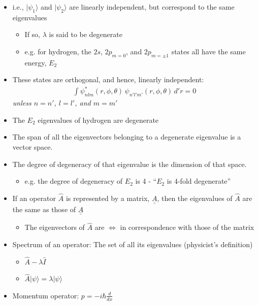 \documentclass[a4paper,11pt,normalem]{article}
\begin{document}
\begin{itemize}
\item
  i.e., \(|\psi_1\rangle\) and \(|\psi_2\rangle\) are linearly
  independent, but correspond to the same eigenvalues
  \begin{itemize}
  \item
    If so, \(\lambda\) is said to be degenerate
  \item
    e.g. for hydrogen, the \(2s\), \(2p_{m=0}\), and \(2p_{m=\pm1}\)
    states all have the same energy, \(E_2\)
  \end{itemize}
\item
  These states are orthogonal, and hence, linearly independent:
\[
    \begin{aligned}
    \int \psi_{nlm}^* (r,\phi,\theta)\,\psi_{n'l'm'}(r,\phi,\theta)\,d'r = 0
    \end{aligned}
\]
\emph{unless \(n = n'\), \(l = l'\), and \(m = m'\)}
\item
  The \(E_2\) eigenvalues of hydrogen are degenerate
\item
  The span of all the eigenvectors belonging to a degenerate eigenvalue
  is a vector space.
\item
  The degree of degeneracy of that eigenvalue is the dimension of that
  space.
  \begin{itemize}
  \item
    e.g. the degree of degeneracy of \(E_2\) is 4 - ``\(E_2\) is 4-fold
    degenerate''
  \end{itemize}
\item
  If an operator \(\hat{A}\) is represented by a matrix,
  \(\underline{\underline{A}}\), then the eigenvalues of \(\hat{A}\) are
  the same as those of \(\underline{\underline{A}}\)
  \begin{itemize}
  \item
    The eigenvectors of \(\hat{A}\) are \(\iff\) in correspondence with
    those of the matrix
  \end{itemize}
\item
  Spectrum of an operator: The set of all its eigenvalues (physicist's
  definition)
  \begin{itemize}
  \item
    \(\hat{A} - \lambda\hat{I}\)
  \item
    \(\hat{A}|\psi\rangle = \lambda|\psi\rangle\)
  \end{itemize}
\item
  Momentum operator: \(p = -i\hbar\frac{d}{dx}\)
\[
    \begin{aligned}

\end{aligned}\]
\end{itemize}
\end{document}
